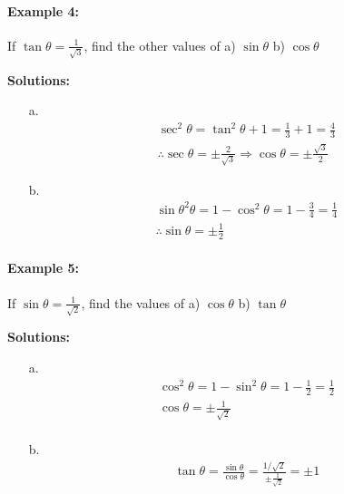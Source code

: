 \documentclass{article}
\begin{document}
\paragraph{Example 4:}
If $\tan\theta = \frac{1}{\sqrt{3}}$, find the other values of a) $\sin\theta$ b) $\cos\theta$

{\scriptsize \textbf{Solutions:}}
\begin{enumerate}
        \item[a.]
        \[
        \begin{aligned}
          \sec^{2}\theta = \tan^{2}\theta + 1 = \frac{1}{3}+1 = \frac{4}{3} \\
          \therefore \sec\theta = \pm\frac{2}{\sqrt{3}} \Rightarrow \cos\theta = \pm \frac{\sqrt{3}}{2}
        \end{aligned}
        \]

        \item[b.]
        \[
        \begin{aligned}
          \sin\theta^{2}\theta = 1 - \cos^{2}\theta = 1 - \frac{3}{4} = \frac{1}{4} \\
          \therefore \sin\theta = \pm\frac{1}{2}
        \end{aligned}
        \]
\end{enumerate}

\paragraph{Example 5:}
If $\sin\theta = \frac{1}{\sqrt{2}}$, find the values of a) $\cos\theta$ b) $\tan\theta$

{\scriptsize \textbf{Solutions:}}
\begin{enumerate}
        \item[a.]
        \[
        \begin{aligned}
          \cos^{2}\theta = 1 - \sin^{2}\theta = 1 - \frac{1}{2} = \frac{1}{2} \\
          \cos\theta = \pm\frac{1}{\sqrt{2}} \\
        \end{aligned}
        \]

        \item[b.]
        \[
        \begin{aligned}
          \tan\theta = \frac{\sin\theta}{\cos\theta} = \frac{1/\sqrt{2}}{\pm\frac{1}{\sqrt{2}}} = \pm 1
        \end{aligned}
        \]
\end{enumerate}
\end{document}
